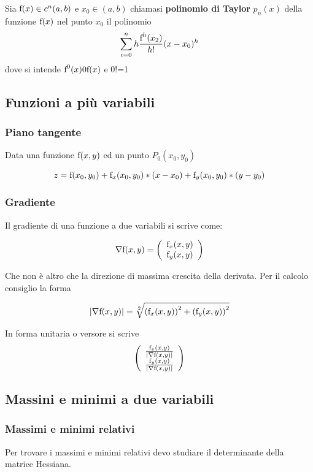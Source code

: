 		Sia $\text{f}(x)\in c^n(a,b)$ e $x_0 \in (a,b)$ chiamasi \textbf{polinomio di Taylor} $p_n(x)$ della funzione $\text{f}(x)$ nel punto $x_0$ il polinomio
		\[
		\sum\limits_{i=0}^n {h \frac{\text{\text{f}}^h(x_2)}{h!}(x-x_0)^h}
		\]
		dove si intende $\text{f}^0(x)0\text{\text{f}}(x)$ e 0!=1
		
		\subsection{Funzioni a più variabili}
		
\subsubsection{Piano tangente}
Data una funzione $\text{\text{f}}(x,y)$ ed un punto $P_0(x_0,y_0)$

\[
z=\text{f}(x_0,y_0)+{\text{f}}_x(x_0,y_0)*(x-x_0)+{\text{f}}_y(x_0,y_0)*(y-y_0)
\]

\subsubsection{Gradiente}
Il gradiente di una funzione a due variabili si scrive come:

\[
{\nabla\text{\text{f}}(x,y)}=\left({
\begin{array}{c}
  {\text{\text{f}}_x(x,y)} \\
  {\text{\text{f}}_y(x,y)}\\
\end{array}
}\right)
\]

Che non è altro che la direzione di massima crescita della derivata.
Per il calcolo consiglio la forma

\[
\left|{{\nabla\text{\text{f}}(x,y)}}\right|
=\sqrt[2]{
  {(\text{\text{f}}_x(x,y))}^2
+
  {(\text{\text{f}}_y(x,y))}^2
}
\]

In forma unitaria o versore si scrive 
\[
\left({
\begin{array}{c}
  {\frac{\text{\text{f}}_x(x,y)}{\left|{\nabla\text{\text{f}}(x,y)}\right|}}\\
  {\frac{\text{\text{f}}_y(x,y)}{\left|{\nabla\text{\text{f}}(x,y)}\right|}}\\
\end{array}
}\right)
\]

\subsection{Massini e minimi a due variabili}

\subsubsection{Massimi e minimi relativi}
Per trovare i massimi e minimi relativi devo studiare il determinante della matrice Hessiana.

